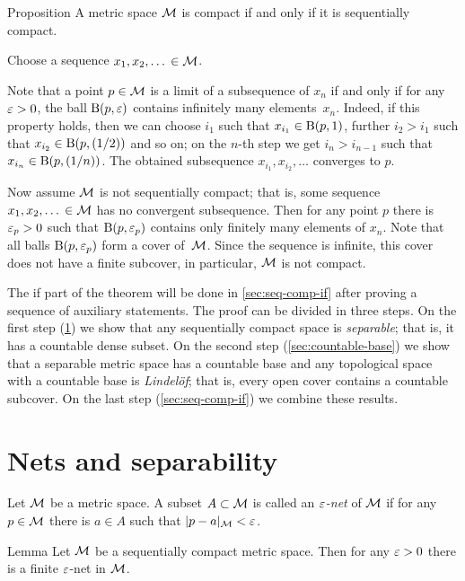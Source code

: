 \begin{thm}{Proposition}\label{prop:seq-comp-metr}
A metric space $\mathcal{M}$ is compact if and only if it is sequentially compact.
\end{thm}

Choose a sequence $x_1,x_2,\ldots{}\in \mathcal{M}$.

Note that a point $p\in \mathcal{M}$ is a limit of a subsequence of $x_n$ if and only if for any $\varepsilon>0$, the ball $\mathrm{B}(p,\varepsilon)$
contains infinitely many elements~$x_n$.
Indeed, if this property holds, then we can choose $i_1$ such that $x_{i_1}\in \mathrm{B}(p,1)$, further $i_2>i_1$ such that $x_{i_2}\in \mathrm{B}(p,(1/2))$ and so on; on the $n$-th step we get $i_n>i_{n-1}$ such that $x_{i_n}\in \mathrm{B}(p,(1/n))$.
The obtained subsequence $x_{i_1},x_{i_2},\ldots$ converges to $p$.

Now assume $\mathcal{M}$ is not sequentially compact;
that is, some sequence $x_1,x_2,\ldots{}\in \mathcal{M}$ has no convergent subsequence.
Then for any point $p$ there is $\varepsilon_p>0$ such that $\mathrm{B}(p,\varepsilon_p)$ contains only finitely many elements of $x_n$.
Note that all balls $\mathrm{B}(p,\varepsilon_p)$ form a cover of~$\mathcal{M}$.
Since the sequence is infinite, this cover does not have a finite subcover,
in particular, $\mathcal{M}$ is not compact.
\qeds

The if part of the theorem will be done in \ref{sec:seq-comp-if} after proving a sequence of auxiliary statements.
The proof can be divided in three steps.
On the first step (\ref{sec:nets}) we show that any sequentially compact space is \textit{separable}; that is, it has a countable dense subset.
On the second step (\ref{sec:countable-base}) we show that a separable metric space has a countable base and any topological space with a countable base is \textit{Lindelöf}; that is, every open cover contains a countable subcover.
On the last step (\ref{sec:seq-comp-if}) we combine these results.



\section{Nets and separability}\label{sec:nets}

Let $\mathcal{M}$ be a metric space.
A subset $A\subset\mathcal{M}$ is called an \emph{$\varepsilon$-net} of $\mathcal{M}$ if for any $p\in \mathcal{M}$ there is $a\in A$ such that $|p-a|_{\mathcal{M}}<\varepsilon$.

\begin{thm}{Lemma}\label{lem:net}
Let $\mathcal{M}$ be a sequentially compact metric space.
Then for any $\varepsilon>0$ there is a finite $\varepsilon$-net in $\mathcal{M}$.
\end{thm}

